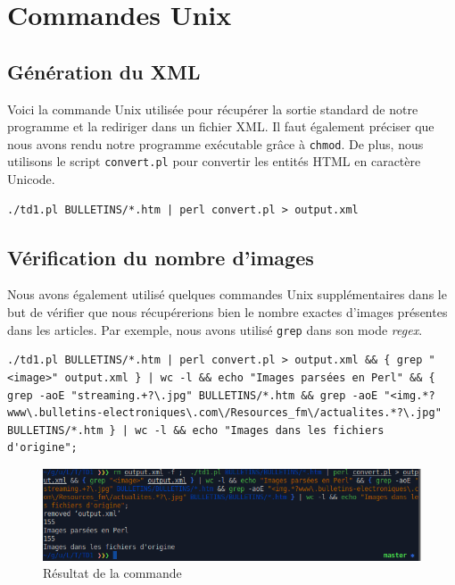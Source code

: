 \section{Commandes Unix}

\subsection{Génération du XML}

Voici la commande Unix utilisée pour récupérer la sortie standard de notre programme et la rediriger dans un fichier XML. Il faut également préciser que nous avons rendu notre programme exécutable grâce à \lstinline{chmod}. De plus, nous utilisons le script \lstinline{convert.pl} pour convertir les entités HTML en caractère Unicode.

\fakeshell
\begin{lstlisting}
./td1.pl BULLETINS/*.htm | perl convert.pl > output.xml
\end{lstlisting}

\subsection{Vérification du nombre d'images}

Nous avons également utilisé quelques commandes Unix supplémentaires dans le but de vérifier que nous récupérerions bien le nombre exactes d'images présentes dans les articles. Par exemple, nous avons utilisé \lstinline{grep} dans son mode \textit{regex}.

\begin{lstlisting}
./td1.pl BULLETINS/*.htm | perl convert.pl > output.xml && { grep "<image>" output.xml } | wc -l && echo "Images parsées en Perl" && { grep -aoE "streaming.+?\.jpg" BULLETINS/*.htm && grep -aoE "<img.*?www\.bulletins-electroniques\.com\/Resources_fm\/actualites.*?\.jpg" BULLETINS/*.htm } | wc -l && echo "Images dans les fichiers d'origine";
\end{lstlisting}

\begin{figure}[H]
  \centering\includegraphics[width=1.00\textwidth]{images/output_td1.png}
  \caption{Résultat de la commande}
\end{figure}


